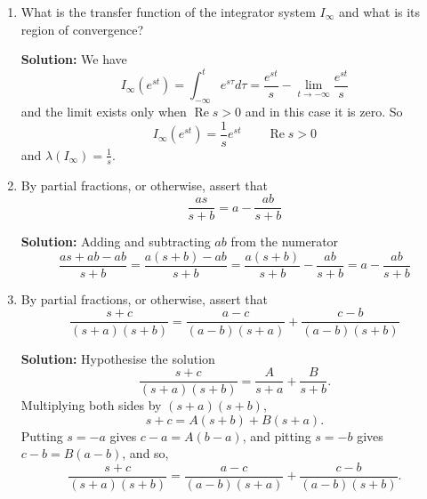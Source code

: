 \documentclass[11pt,a4paper]{book}
\theoremstyle{plain}
\numberwithin{equation}{section}
\renewcommand{\Re}{\operatorname{Re}}
\newenvironment{solution}{\begin{footnotesize}\textbf{Solution:}}{\end{footnotesize}}
\newenvironment{excersizelist}{%
  \renewcommand*{\theenumi}{\thechapter.\arabic{enumi}}%
  \newcommand\itemadvanced{\stepcounter{enumi}\item[$\ast$\, \theenumi.]}
  \begin{enumerate}
}{%
  \end{enumerate}
}
\begin{document}
\begin{excersizelist}
\begin{solution}
We now show the result for the differentiator $D$.  Our approach works for all functions that will be of interest to us.  An alternative approach makes use of Lebesque's dominated convergence theorem~\citep[page~179]{Rudin_real_and_complex_analysis}.  
Put $y = D(x)$.  Taking Laplace transforms
\[
\calL(y) = \calL\big(D(x)\big) = \int_{-\infty}^{\infty} D(x,t) e^{-st} dt.
\]
Integrating by parts 
\[
\calL(y) = \big[ x(t) e^{-st} \big]_{-\infty}^\infty + s\int_{-\infty}^{\infty} x(t) e^{-st} dt = \big[ x(t) e^{-st} \big]_{-\infty}^\infty + s\calL(x).
\]
The assumption that we make is that 
\[
\lim_{t\to\infty} x(t) e^{-st} = 0 \qquad \text{and} \qquad \lim_{t\to-\infty} x(t) e^{-st} = 0
\]
whenever $s$ is in the region of convergence of both $x$ and $y$.  In this case $\calL(y) = s\calL(x)$ as required.  Observe that our assumption is true if, for example, $x(t)$ is finite.

The result follows for the $k$th differentiator $D^k$ because
\[
\calL\big( D^k(y) \big) = \calL\big( D(D^{k-1}(y)) \big) = s \calL\big( D^{k-1}(y) \big)
\]
and unravelling this recursion gives
\[
\calL\big( D^k(y) \big) = \underbrace{s \times s \times \dots \times s}_{\text{$k-1$ times}} \times \calL\big( D(y) \big) = s^k \calL( y ) = \lambda(D^k)\calL(y) 
\]
as required.
\end{solution}


\item What is the transfer function of the integrator system $I_\infty$ and what is its region of convergence? 
\begin{solution}
We have
\[
I_\infty(e^{st}) = \int_{-\infty}^t e^{s\tau} d\tau = \frac{e^{st}}{s} - \lim_{t\to -\infty}\frac{e^{st}}{s}
\]
and the limit exists only when $\Re{s} > 0$ and in this case it is zero.  So
\[
I_\infty(e^{st}) = \frac{1}{s} e^{st} \qquad \Re{s} > 0
\]
and $\lambda(I_\infty) = \tfrac{1}{s}$.
\end{solution}


\item \label{exer:partialfracfirstorder} By partial fractions, or otherwise, assert that
\[
\frac{as}{s+b} = a - \frac{ab}{s+b}
\]
\begin{solution}
Adding and subtracting $ab$ from the numerator
\[
\frac{as+ab-ab}{s+b} = \frac{a(s+b)-ab}{s+b} = \frac{a(s+b)}{s+b} - \frac{ab}{s+b} = a - \frac{ab}{s+b}
\]
\end{solution}

\item \label{exer:partialfracsecondorder} By partial fractions, or otherwise, assert that
\[
\frac{s + c}{(s+a)(s+b)} = \frac{a-c}{(a-b)(s+a)} + \frac{c-b}{(a-b)(s+b)}
\]
\begin{solution}
Hypothesise the solution
\[
\frac{s + c}{(s+a)(s+b)} = \frac{A}{s+a} + \frac{B}{s+b}.
\]
Multiplying both sides by $(s+a)(s+b)$,
\[
s+c = A(s+b) + B(s+a).
\]
Putting $s = -a$ gives $c-a = A(b-a)$, and pitting $s=-b$ gives $c-b = B(a-b)$, and so,
\[
\frac{s+c}{(s+a)(s+b)} = \frac{a-c}{(a-b)(s+a)} + \frac{c-b}{(a-b)(s+b)}.
\]
\end{solution}


\end{excersizelist}
\end{document}
